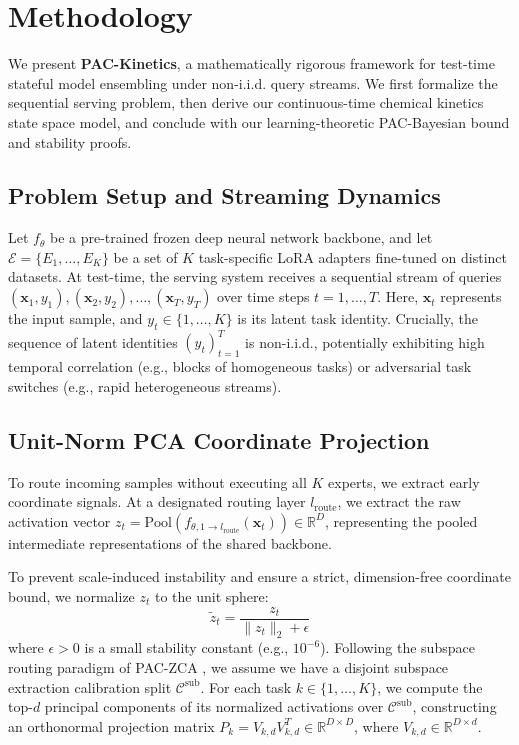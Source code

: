 \section{Methodology}
\label{sec:method}

We present \textbf{PAC-Kinetics}, a mathematically rigorous framework for test-time stateful model ensembling under non-i.i.d. query streams. We first formalize the sequential serving problem, then derive our continuous-time chemical kinetics state space model, and conclude with our learning-theoretic PAC-Bayesian bound and stability proofs.

\subsection{Problem Setup and Streaming Dynamics}
\label{sec:problem_setup}
Let $f_\theta$ be a pre-trained frozen deep neural network backbone, and let $\mathcal{E} = \{E_1, \dots, E_K\}$ be a set of $K$ task-specific LoRA adapters fine-tuned on distinct datasets. At test-time, the serving system receives a sequential stream of queries $(\mathbf{x}_1, y_1), (\mathbf{x}_2, y_2), \dots, (\mathbf{x}_T, y_T)$ over time steps $t = 1, \dots, T$. Here, $\mathbf{x}_t$ represents the input sample, and $y_t \in \{1,\dots, K\}$ is its latent task identity. Crucially, the sequence of latent identities $(y_t)_{t=1}^T$ is non-i.i.d., potentially exhibiting high temporal correlation (e.g., blocks of homogeneous tasks) or adversarial task switches (e.g., rapid heterogeneous streams).

\subsection{Unit-Norm PCA Coordinate Projection}
\label{sec:pca_projection}
To route incoming samples without executing all $K$ experts, we extract early coordinate signals. At a designated routing layer $l_{\text{route}}$, we extract the raw activation vector $z_t = \text{Pool}( f_{\theta, 1 \to l_{\text{route}}}(\mathbf{x}_t) ) \in \mathbb{R}^D$, representing the pooled intermediate representations of the shared backbone. 

To prevent scale-induced instability and ensure a strict, dimension-free coordinate bound, we normalize $z_t$ to the unit sphere:
\begin{equation}
    \tilde{z}_t = \frac{z_t}{\|z_t\|_2 + \epsilon}
\end{equation}
where $\epsilon > 0$ is a small stability constant (e.g., $10^{-6}$). Following the subspace routing paradigm of PAC-ZCA \cite{pac_zca_2026}, we assume we have a disjoint subspace extraction calibration split $\mathcal{C}^{\text{sub}}$. For each task $k \in \{1,\dots, K\}$, we compute the top-$d$ principal components of its normalized activations over $\mathcal{C}^{\text{sub}}$, constructing an orthonormal projection matrix $P_k = V_{k, d} V_{k, d}^T \in \mathbb{R}^{D \times D}$, where $V_{k, d} \in \mathbb{R}^{D \times d}$. 

